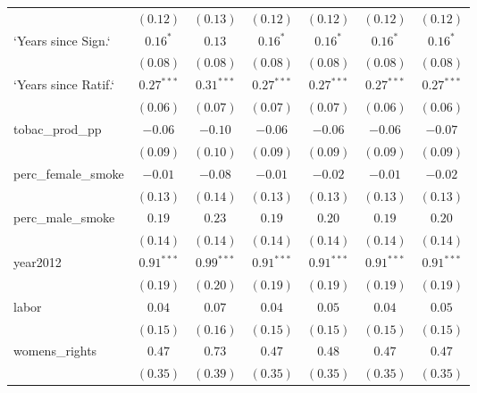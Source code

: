 \begin{table}[!h]
\begin{center}
\begin{tabular}{l c c c c c c }
                        & $(0.12)$     & $(0.13)$      & $(0.12)$     & $(0.12)$     & $(0.12)$     & $(0.12)$     \\
`Years since Sign.`     & $0.16^{*}$   & $0.13$        & $0.16^{*}$   & $0.16^{*}$   & $0.16^{*}$   & $0.16^{*}$   \\
                        & $(0.08)$     & $(0.08)$      & $(0.08)$     & $(0.08)$     & $(0.08)$     & $(0.08)$     \\
`Years since Ratif.`    & $0.27^{***}$ & $0.31^{***}$  & $0.27^{***}$ & $0.27^{***}$ & $0.27^{***}$ & $0.27^{***}$ \\
                        & $(0.06)$     & $(0.07)$      & $(0.07)$     & $(0.07)$     & $(0.06)$     & $(0.06)$     \\
tobac\_prod\_pp         & $-0.06$      & $-0.10$       & $-0.06$      & $-0.06$      & $-0.06$      & $-0.07$      \\
                        & $(0.09)$     & $(0.10)$      & $(0.09)$     & $(0.09)$     & $(0.09)$     & $(0.09)$     \\
perc\_female\_smoke     & $-0.01$      & $-0.08$       & $-0.01$      & $-0.02$      & $-0.01$      & $-0.02$      \\
                        & $(0.13)$     & $(0.14)$      & $(0.13)$     & $(0.13)$     & $(0.13)$     & $(0.13)$     \\
perc\_male\_smoke       & $0.19$       & $0.23$        & $0.19$       & $0.20$       & $0.19$       & $0.20$       \\
                        & $(0.14)$     & $(0.14)$      & $(0.14)$     & $(0.14)$     & $(0.14)$     & $(0.14)$     \\
year2012                & $0.91^{***}$ & $0.99^{***}$  & $0.91^{***}$ & $0.91^{***}$ & $0.91^{***}$ & $0.91^{***}$ \\
                        & $(0.19)$     & $(0.20)$      & $(0.19)$     & $(0.19)$     & $(0.19)$     & $(0.19)$     \\
labor                   & $0.04$       & $0.07$        & $0.04$       & $0.05$       & $0.04$       & $0.05$       \\
                        & $(0.15)$     & $(0.16)$      & $(0.15)$     & $(0.15)$     & $(0.15)$     & $(0.15)$     \\
womens\_rights          & $0.47$       & $0.73$        & $0.47$       & $0.48$       & $0.47$       & $0.47$       \\
                        & $(0.35)$     & $(0.39)$      & $(0.35)$     & $(0.35)$     & $(0.35)$     & $(0.35)$     \\

\end{tabular}
\end{center}
\end{table}
